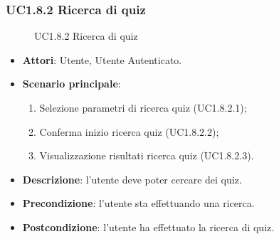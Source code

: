 \subsubsection{UC1.8.2 Ricerca di quiz}
\begin{figure}[H]
\centering
\noindent{}
\caption{UC1.8.2 Ricerca di quiz}
\end{figure}
\begin{itemize}
\item \textbf{Attori}: Utente, Utente Autenticato.
\item \textbf{Scenario principale}:
\begin{enumerate}
\item Selezione parametri di ricerca quiz (UC1.8.2.1);
\item Conferma inizio ricerca quiz (UC1.8.2.2);
\item Visualizzazione risultati ricerca quiz (UC1.8.2.3).
\end{enumerate}
\item \textbf{Descrizione}: l'utente deve poter cercare dei quiz.
\item \textbf{Precondizione}: l'utente sta effettuando una ricerca.
\item \textbf{Postcondizione}: l'utente ha effettuato la ricerca di quiz.
\end{itemize}
